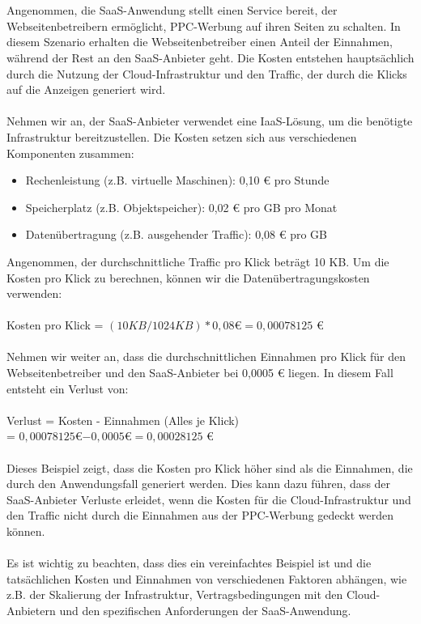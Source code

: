 \documentclass[../vs-script-first-v01.tex]{subfiles}
\begin{document}
\\\\
Angenommen, die SaaS-Anwendung stellt einen Service bereit, der Webseitenbetreibern ermöglicht, PPC-Werbung auf ihren Seiten zu schalten. In diesem Szenario erhalten die Webseitenbetreiber einen Anteil der Einnahmen, während der Rest an den SaaS-Anbieter geht. Die Kosten entstehen hauptsächlich durch die Nutzung der Cloud-Infrastruktur und den Traffic, der durch die Klicks auf die Anzeigen generiert wird.
\\\\
Nehmen wir an, der SaaS-Anbieter verwendet eine IaaS-Lösung, um die benötigte Infrastruktur bereitzustellen. Die Kosten setzen sich aus verschiedenen Komponenten zusammen:
\begin{itemize}
\item Rechenleistung (z.B. virtuelle Maschinen): 0,10 € pro Stunde
\item Speicherplatz (z.B. Objektspeicher): 0,02 € pro GB pro Monat
\item Datenübertragung (z.B. ausgehender Traffic): 0,08 € pro GB
\end{itemize}
Angenommen, der durchschnittliche Traffic pro Klick beträgt 10 KB. Um die Kosten pro Klick zu berechnen, können wir die Datenübertragungskosten verwenden:
\\\\
Kosten pro Klick = $(10 KB / 1024 KB) * 0,08 $€$ = 0,00078125$ €
\\\\
Nehmen wir weiter an, dass die durchschnittlichen Einnahmen pro Klick für den Webseitenbetreiber und den SaaS-Anbieter bei 0,0005 € liegen. In diesem Fall entsteht ein Verlust von:
\\\\
Verlust = Kosten - Einnahmen (Alles je Klick) \\
= $0,00078125 $€$ - 0,0005 $€$ = 0,00028125$ €
\\\\
Dieses Beispiel zeigt, dass die Kosten pro Klick höher sind als die Einnahmen, die durch den Anwendungsfall generiert werden. Dies kann dazu führen, dass der SaaS-Anbieter Verluste erleidet, wenn die Kosten für die Cloud-Infrastruktur und den Traffic nicht durch die Einnahmen aus der PPC-Werbung gedeckt werden können.
\\\\
Es ist wichtig zu beachten, dass dies ein vereinfachtes Beispiel ist und die tatsächlichen Kosten und Einnahmen von verschiedenen Faktoren abhängen, wie z.B. der Skalierung der Infrastruktur, Vertragsbedingungen mit den Cloud-Anbietern und den spezifischen Anforderungen der SaaS-Anwendung.
\end{document}
